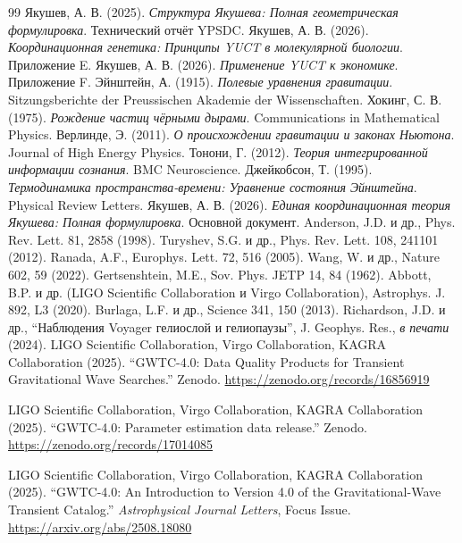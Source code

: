 \documentclass[12pt,a4paper]{article}
\theoremstyle{remark}
\begin{document}
	\begin{thebibliography}{99}
		 Якушев, А. В. (2025). \emph{Структура Якушева: Полная геометрическая формулировка}. Технический отчёт YPSDC.
		 Якушев, А. В. (2026). \emph{Координационная генетика: Принципы YUCT в молекулярной биологии}. Приложение E.
		 Якушев, А. В. (2026). \emph{Применение YUCT к экономике}. Приложение F.
		 Эйнштейн, А. (1915). \emph{Полевые уравнения гравитации}. Sitzungsberichte der Preussischen Akademie der Wissenschaften.
		 Хокинг, С. В. (1975). \emph{Рождение частиц чёрными дырами}. Communications in Mathematical Physics.
		 Верлинде, Э. (2011). \emph{О происхождении гравитации и законах Ньютона}. Journal of High Energy Physics.
		 Тонони, Г. (2012). \emph{Теория интегрированной информации сознания}. BMC Neuroscience.
		 Джейкобсон, Т. (1995). \emph{Термодинамика пространства-времени: Уравнение состояния Эйнштейна}. Physical Review Letters.
		 Якушев, А. В. (2026). \emph{Единая координационная теория Якушева: Полная формулировка}. Основной документ.
		Anderson, J.D. и др., Phys. Rev. Lett. 81, 2858 (1998).
		Turyshev, S.G. и др., Phys. Rev. Lett. 108, 241101 (2012).
		Ranada, A.F., Europhys. Lett. 72, 516 (2005).
		Wang, W. и др., Nature 602, 59 (2022).
		Gertsenshtein, M.E., Sov. Phys. JETP 14, 84 (1962).
		Abbott, B.P. и др. (LIGO Scientific Collaboration и Virgo Collaboration), Astrophys. J. 892, L3 (2020).
		Burlaga, L.F. и др., Science 341, 150 (2013).
		Richardson, J.D. и др., ``Наблюдения Voyager гелиослой и гелиопаузы'', J. Geophys. Res., \textit{в печати} (2024).
		LIGO Scientific Collaboration, Virgo Collaboration, KAGRA Collaboration (2025). ``GWTC-4.0: Data Quality Products for Transient Gravitational Wave Searches.'' Zenodo. \url{https://zenodo.org/records/16856919}
		
		LIGO Scientific Collaboration, Virgo Collaboration, KAGRA Collaboration (2025). ``GWTC-4.0: Parameter estimation data release.'' Zenodo. \url{https://zenodo.org/records/17014085}
		
		LIGO Scientific Collaboration, Virgo Collaboration, KAGRA Collaboration (2025). ``GWTC-4.0: An Introduction to Version 4.0 of the Gravitational-Wave Transient Catalog.'' \textit{Astrophysical Journal Letters}, Focus Issue. \url{https://arxiv.org/abs/2508.18080}
		

\end{thebibliography}
\end{document}
